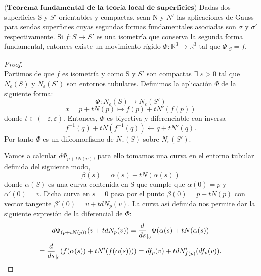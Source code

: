 \begin{teorema} \label{teo:rig2}
	$\textbf{(Teorema fundamental de la teoría local de superficies)}$ Dadas dos superficies S y $S'$ orientables y compactas, sean N y $N'$ las aplicaciones de Gauss para sendas superficies cuyas segundas formas fundamentales asociadas son $\sigma$ y $\sigma'$ respectivamente.
	Si $f : S \to S'$ es una isometría que conserva la segunda forma fundamental, entonces existe un movimiento rígido $\Phi : \mathbb{R}^3 \to \mathbb{R}^3$ tal que $\Phi_{\mid S} = f$.
\end{teorema}

\begin{proof}
	${ }$\\
	
	Partimos de que $f$ es isometría y como S y $S'$ son compactas $\exists$ $\varepsilon > 0$ tal que $N_\varepsilon(S)$ y $N_\varepsilon(S')$ son entornos tubulares. Definimos la aplicación $\Phi$ de la siguiente forma:
	${ }$\\
	\[
	\Phi : N_\varepsilon(S) \longrightarrow N_\varepsilon(S')
	\]
	\[
	x = p + tN(p) \longmapsto f(p) + tN'(f(p))
	\]
	${ }$\\
	donde $t \in (-\varepsilon, \varepsilon)$. Entonces, $\Phi$ es biyectiva y diferenciable con inversa
	${ }$\\
	\[
	f^{-1}(q) + tN(f^{-1}(q)) \longleftarrow q + tN'(q).
	\]
	${ }$\\
	Por tanto $\Phi$ es un difeomorfismo de $N_\varepsilon(S)$ sobre $N_\varepsilon(S')$.
	
	${ }$\\	
	
	Vamos a calcular $d\Phi_{p+tN(p)}$, para ello tomamos una curva en el entorno tubular definida del siguiente modo,
	${ }$\\
	\[
	\beta(s) = \alpha(s) + tN(\alpha(s))
	\]
	${ }$\\
	donde $\alpha(S)$ es una curva contenida en S que cumple que $\alpha(0) = p$ y $\alpha'(0) = v$. Dicha curva en $s = 0$ pasa por el punto $\beta(0) = p + tN(p)$  con vector tangente $\beta'(0) = v + tdN_p(v)$. La curva así definida nos permite dar la siguiente expresión de la diferencial de $\Phi$:
	${ }$\\
	\[
	d\Phi_{(p + tN(p))}(v + tdN_p(v)) = \frac{d}{ds}_{\arrowvert_0} \Phi(\alpha(s) + tN(\alpha(s))
	\]
	\[
	= \frac{d}{ds}_{\arrowvert_0} (f(\alpha(s)) + tN'(f(\alpha(s)))) = df_p(v) + tdN'_{f(p)}(df_p(v)).
	\]
	

\end{proof}
